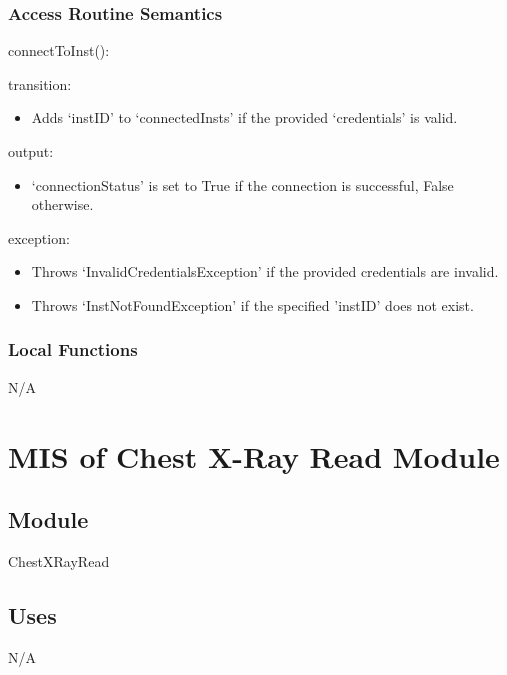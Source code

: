 \documentclass[12pt, titlepage]{article}
\begin{document}
\subsubsection{Access Routine Semantics}

\noindent connectToInst():
\begin{itemize}
  \begin{item}
    transition:
    \begin{itemize}
      \item Adds `instID' to `connectedInsts' if the provided `credentials' is
        valid.
    \end{itemize}
  \end{item}
  \begin{item}
    output:
    \begin{itemize}
      \item `connectionStatus' is set to True if the connection is successful,
        False otherwise.
    \end{itemize}
  \end{item}
  \begin{item}
    exception:
    \begin{itemize}
      \item Throws `InvalidCredentialsException' if the provided credentials are invalid.
      \item Throws `InstNotFoundException' if the specified 'instID' does not exist.
    \end{itemize}
  \end{item}
\end{itemize}

\subsubsection{Local Functions}
N/A

\newpage

\section{MIS of Chest X-Ray Read Module} \label{mChXRR}

\subsection{Module}
ChestXRayRead

\subsection{Uses}
N/A
\end{document}
